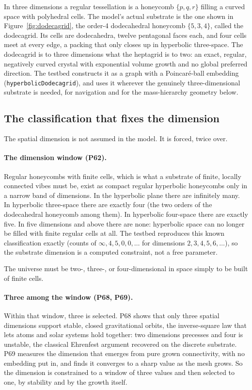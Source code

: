 In three dimensions a regular tessellation is a honeycomb $\{p,q,r\}$ filling a curved space with
polyhedral cells. The model's actual substrate is the one shown in Figure~\ref{fig:dodecagrid}, the
order-4 dodecahedral honeycomb $\{5,3,4\}$, called the dodecagrid. Its cells are dodecahedra, twelve
pentagonal faces each, and four cells meet at every edge, a packing that only closes up in
hyperbolic three-space. The dodecagrid is to three dimensions what the heptagrid is to two: an
exact, regular, negatively curved crystal with exponential volume growth and no global preferred
direction. The testbed constructs it as a graph with a Poincar\'e-ball embedding
(\texttt{hyperbolicDodecagrid}), and uses it wherever the genuinely three-dimensional substrate is
needed, for navigation and for the mass-hierarchy geometry below.

\subsection{The classification that fixes the dimension}

The spatial dimension is not assumed in the model. It is forced, twice over.

\paragraph{The dimension window (P62).}
Regular honeycombs with finite cells, which is what a substrate of finite, locally connected vibes
must be, exist as compact regular hyperbolic honeycombs only in a narrow band of dimensions. In the
hyperbolic plane there are infinitely many. In hyperbolic three-space there are exactly four (the
two orders of the dodecahedral honeycomb among them). In hyperbolic four-space there are exactly
five. In five dimensions and above there are none: hyperbolic space can no longer be filled with
finite regular cells at all. The testbed reproduces this known classification exactly (counts of
$\infty, 4, 5, 0, 0, \ldots$ for dimensions $2,3,4,5,6,\ldots$), so the substrate dimension is a
computed constraint, not a free parameter.

 The universe must be two-, three-, or four-dimensional in
space simply to be built of finite cells.

\paragraph{Three among the window (P68, P69).}
Within that window, three is selected. P68 shows that only three spatial dimensions support stable,
closed gravitational orbits, the inverse-square law that lets atoms and solar systems hold together:
two dimensions precesses and four is unstable, the classical Ehrenfest argument \citep{ehrenfest1917way}
recovered on the discrete substrate. P69 measures the dimension that emerges from pure grown
connectivity, with no embedding put in, and finds it converges to a sharp value as the mesh grows.
So the dimension is constrained to a window of three values and then selected to one, by stability
and by the growth itself.

